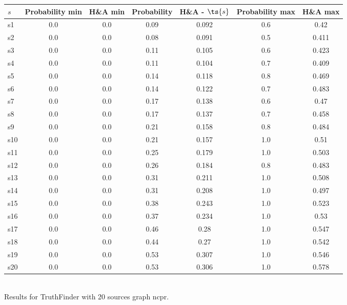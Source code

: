 \documentclass{article}
\begin{document}
\noindent\begin{tabular}{|l|c|c|c|c|c|c|}
\hline
$s$& Probability min & H\&A min & Probability & H\&A - $\ts{s}$ & Probability max & H\&A max\\
\hline
s1 &0.0 & 0.0 & 0.09 & 0.092 & 0.6 & 0.42\\
\hline
s2 &0.0 & 0.0 & 0.08 & 0.091 & 0.5 & 0.411\\
\hline
s3 &0.0 & 0.0 & 0.11 & 0.105 & 0.6 & 0.423\\
\hline
s4 &0.0 & 0.0 & 0.11 & 0.104 & 0.7 & 0.409\\
\hline
s5 &0.0 & 0.0 & 0.14 & 0.118 & 0.8 & 0.469\\
\hline
s6 &0.0 & 0.0 & 0.14 & 0.122 & 0.7 & 0.483\\
\hline
s7 &0.0 & 0.0 & 0.17 & 0.138 & 0.6 & 0.47\\
\hline
s8 &0.0 & 0.0 & 0.17 & 0.137 & 0.7 & 0.458\\
\hline
s9 &0.0 & 0.0 & 0.21 & 0.158 & 0.8 & 0.484\\
\hline
s10 &0.0 & 0.0 & 0.21 & 0.157 & 1.0 & 0.51\\
\hline
s11 &0.0 & 0.0 & 0.25 & 0.179 & 1.0 & 0.503\\
\hline
s12 &0.0 & 0.0 & 0.26 & 0.184 & 0.8 & 0.483\\
\hline
s13 &0.0 & 0.0 & 0.31 & 0.211 & 1.0 & 0.508\\
\hline
s14 &0.0 & 0.0 & 0.31 & 0.208 & 1.0 & 0.497\\
\hline
s15 &0.0 & 0.0 & 0.38 & 0.243 & 1.0 & 0.523\\
\hline
s16 &0.0 & 0.0 & 0.37 & 0.234 & 1.0 & 0.53\\
\hline
s17 &0.0 & 0.0 & 0.46 & 0.28 & 1.0 & 0.547\\
\hline
s18 &0.0 & 0.0 & 0.44 & 0.27 & 1.0 & 0.542\\
\hline
s19 &0.0 & 0.0 & 0.53 & 0.307 & 1.0 & 0.546\\
\hline
s20 &0.0 & 0.0 & 0.53 & 0.306 & 1.0 & 0.578\\
\hline
\end{tabular}\\

\noindent Results for TruthFinder with 20 sources graph ncpr.
\end{document}
